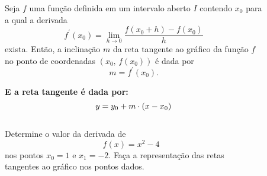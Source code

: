 \begin{frame}
  \begin{columns}[onlytextwidth]
    \begin{column}{0.5\textwidth}\vspace{-0.5cm}
      \begin{theorem}
        Seja $f$ uma função definida em um intervalo aberto $I$ contendo $x_{0}$ para a qual a derivada
        \begin{equation*}
          f^{\prime}(x_{0}) = \lim_{h\to 0}\frac{f(x_{0}+h)-f(x_{0})}{h}
        \end{equation*}
        exista. Então, a inclinação $m$ da reta tangente ao gráfico da função $f$ no ponto de coordenadas $(x_{0},\,f(x_{0}))$ é dada por
        \begin{equation*}
          m = f^{\prime}(x_{0}).
        \end{equation*}
      \end{theorem}
      \begin{highlight}
        \textbf{E a reta tangente é dada por:}
        \begin{equation*}
          y = y_{0} + m\cdot(x-x_{0})\vspace*{-0.2cm}
        \end{equation*}
      \end{highlight}
    \end{column}
    \begin{column}{0.5\textwidth}\vspace{-0.5cm}
      \begin{figure}
      \end{figure}
    \end{column}
  \end{columns}
\end{frame}

\begin{frame}
  \begin{columns}[onlytextwidth]
    \begin{column}{0.49\textwidth}\vspace{-0.5cm}
      \begin{example}
        Determine o valor da derivada de
        \begin{equation*}
          f(x) = x^{2} - 4
        \end{equation*}
        nos pontos $x_{0} = 1$ e $x_{1}=-2$. Faça a representação das retas tangentes ao gráfico nos pontos dados.
      \end{example}
    \end{column}
    \begin{column}{0.49\textwidth}\vspace{-0.8cm}
      \begin{figure}
      \end{figure}
    \end{column}
  \end{columns}
\end{frame}

